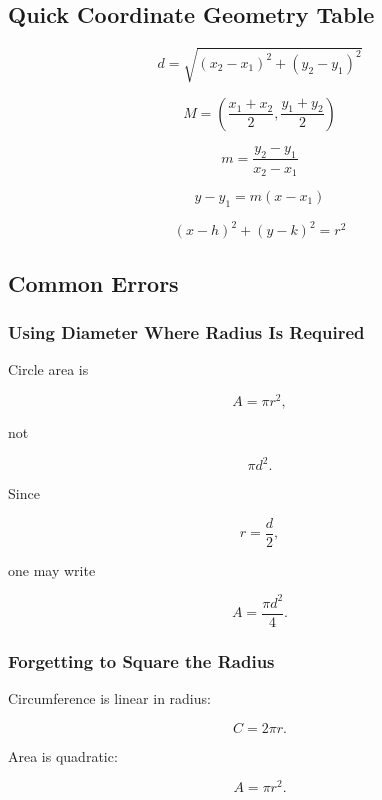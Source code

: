 \subsection{Quick Coordinate Geometry Table}
\label{subsec:quick-coordinate-geometry-table}

\[
\boxed{
d
=
\sqrt{
(x_2-x_1)^2+(y_2-y_1)^2
}
}
\]

\[
\boxed{
M
=
\left(
\frac{x_1+x_2}{2},
\frac{y_1+y_2}{2}
\right)
}
\]

\[
\boxed{
m
=
\frac{
y_2-y_1
}{
x_2-x_1
}
}
\]

\[
\boxed{
y-y_1
=
m(x-x_1)
}
\]

\[
\boxed{
(x-h)^2+(y-k)^2=r^2
}
\]

\subsection{Common Errors}
\label{subsec:geometric-formulas-common-errors}

\subsubsection{Using Diameter Where Radius Is Required}

Circle area is

\[
\boxed{
A=\pi r^2,
}
\]

not

\[
\pi d^2.
\]

Since

\[
r=\frac d2,
\]

one may write

\[
\boxed{
A
=
\frac{\pi d^2}{4}.
}
\]

\subsubsection{Forgetting to Square the Radius}

Circumference is linear in radius:

\[
C=2\pi r.
\]

Area is quadratic:

\[
A=\pi r^2.
\]

